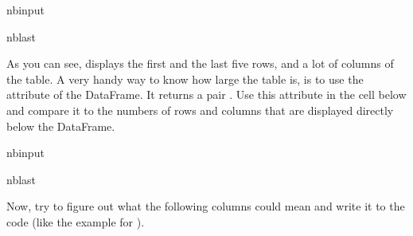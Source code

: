 \documentclass[letterpaper,10pt,english]{sphinxmanual}
\begin{document}
\begin{sphinxuseclass}{nbinput}
\begin{sphinxuseclass}{nblast}
{
\begin{sphinxVerbatim}[commandchars=\\\{\}]
\llap{\color{nbsphinxin}[ ]:\,\hspace{\fboxrule}\hspace{\fboxsep}}
\end{sphinxVerbatim}
}

\end{sphinxuseclass}
\end{sphinxuseclass}
\sphinxAtStartPar
As you can see,  displays the first and the last five rows, and a lot of columns of the table. A very handy way to know how large the table is, is to use the  attribute of the  DataFrame. It returns a pair . Use this attribute in the cell below and compare it to the numbers of rows and columns that are displayed directly below the DataFrame.

\begin{sphinxuseclass}{nbinput}
\begin{sphinxuseclass}{nblast}
{
\begin{sphinxVerbatim}[commandchars=\\\{\}]
\llap{\color{nbsphinxin}[ ]:\,\hspace{\fboxrule}\hspace{\fboxsep}}
\end{sphinxVerbatim}
}

\end{sphinxuseclass}
\end{sphinxuseclass}
\sphinxAtStartPar
Now, try to figure out what the following columns could mean and write it to the code (like the example for ).
\end{document}
